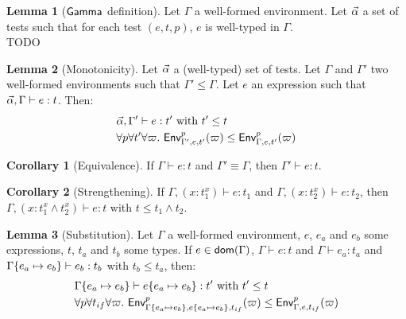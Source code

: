 \documentclass[a4paper]{article}
\theoremstyle{definition}
\newtheorem{lemma}{Lemma}
\newtheorem{corollary}{Corollary}
\begin{document}
        \begin{lemma}[$\textsf{Gamma}_{} $ definition]
          Let $\Gamma$ a well-formed environment. Let $\vec \alpha$ a set of tests such that for each test $(e,t,p)$, $e$ is well-typed in $\Gamma$.\\
          TODO
        \end{lemma}

        \begin{lemma}[Monotonicity]
          Let $\vec \alpha$ a (well-typed) set of tests. Let $\Gamma$ and $\Gamma'$ two well-formed environments such that $\Gamma' \leq \Gamma$.
          Let $e$ an expression such that $\vec \alpha, \Gamma \vdash e:t$.
          Then:\\
          \begin{align*}
            &\vec \alpha, \Gamma' \vdash e:t' \text{ with } t' \leq t\\
            &\forall p \forall t' \forall \varpi.\ \textsf{Env}^{p}_{\Gamma',e,t'} (\varpi) \leq \textsf{Env}^{p}_{\Gamma,e,t'} (\varpi)
          \end{align*}
        \end{lemma}
    
        \begin{corollary}[Equivalence]
          If $\Gamma \vdash e:t$ and $\Gamma' \equiv \Gamma$, then $\Gamma' \vdash e:t$.
        \end{corollary}
    
        \begin{corollary}[Strengthening]
          If $\Gamma, (x:t_1^x) \vdash e:t_1$ and $\Gamma, (x:t_2^x) \vdash e:t_2$, then
          $\Gamma, (x:t_1^x\land t_2^x) \vdash e:t$ with $t \leq t_1\land t_2$.
        \end{corollary}
    
        \begin{lemma}[Substitution]
          Let $\Gamma$ a well-formed environment, $e$, $e_a$ and $e_b$ some expressions, $t$, $t_a$ and $t_b$ some types.
          If $e \in \textsf{dom}(\Gamma)$, $\Gamma \vdash e:t$ and $\Gamma \vdash e_a : t_a$ and $\Gamma\{e_a \mapsto e_b\} \vdash e_b:t_b$ with $t_b \leq t_a$, then:
          \begin{align*}
            &\Gamma \{e_a \mapsto e_b\} \vdash e \{e_a \mapsto e_b\}:t' \text{ with } t'\leq t\\
            &\forall p \forall t_{if} \forall \varpi.\ \textsf{Env}^{p}_{\Gamma\{e_a \mapsto e_b\},e\{e_a \mapsto e_b\},t_{if}} (\varpi) \leq \textsf{Env}^{p}_{\Gamma,e,t_{if}} (\varpi)
          \end{align*}
        \end{lemma}
    
\end{document}

